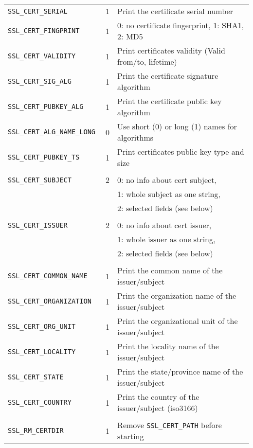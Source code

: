 \documentclass[documentation]{subfiles}
\begin{document}
\begin{longtable}{>{\tt}lcl}
    SSL\_CERT\_SERIAL          & 1    & Print the certificate serial number\\
    SSL\_CERT\_FINGPRINT       & 1    & 0: no certificate fingerprint, 1: SHA1, 2: MD5\\
    SSL\_CERT\_VALIDITY        & 1    & Print certificates validity (Valid from/to, lifetime)\\
    SSL\_CERT\_SIG\_ALG        & 1    & Print the certificate signature algorithm\\
    SSL\_CERT\_PUBKEY\_ALG     & 1    & Print the certificate public key algorithm\\
    SSL\_CERT\_ALG\_NAME\_LONG & 0    & Use short (0) or long (1) names for algorithms\\
    SSL\_CERT\_PUBKEY\_TS      & 1    & Print certificates public key type and size\\
    \\
    SSL\_CERT\_SUBJECT         & 2    & 0: no info about cert subject,\\
                               &      & 1: whole subject as one string,\\
                               &      & 2: selected fields (see below)\\
    \\
    SSL\_CERT\_ISSUER          & 2    & 0: no info about cert issuer,\\
                               &      & 1: whole issuer as one string,\\
                               &      & 2: selected fields (see below)\\
    \\
    SSL\_CERT\_COMMON\_NAME    & 1    & Print the common name of the issuer/subject\\
    SSL\_CERT\_ORGANIZATION    & 1    & Print the organization name of the issuer/subject\\
    SSL\_CERT\_ORG\_UNIT       & 1    & Print the organizational unit of the issuer/subject\\
    SSL\_CERT\_LOCALITY        & 1    & Print the locality name of the issuer/subject\\
    SSL\_CERT\_STATE           & 1    & Print the state/province name of the issuer/subject\\
    SSL\_CERT\_COUNTRY         & 1    & Print the country of the issuer/subject (iso3166)\\
    \\
    SSL\_RM\_CERTDIR           & 1    & Remove {\tt SSL\_CERT\_PATH} before starting\\

\end{longtable}
\end{document}
